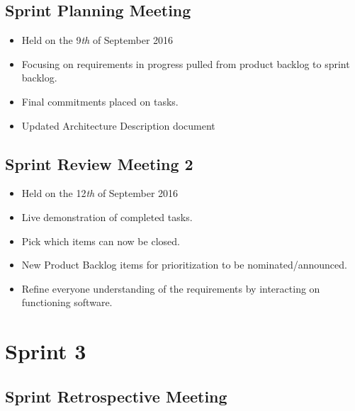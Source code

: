 \documentclass[a4paper]{article}
\begin{document}
\subsection{Sprint Planning Meeting}

\begin{itemize}
\item Held on the 9\textit{th} of September 2016
\item Focusing on requirements in progress pulled from product backlog to sprint backlog.
\item Final commitments placed on tasks.
\item Updated Architecture Description document
\end{itemize}

\subsection{Sprint Review Meeting 2}

\begin{itemize}
\item Held on the 12\textit{th} of September 2016
\item Live demonstration of completed tasks.
\item Pick which items can now be closed.
\item New Product Backlog items for prioritization to be nominated/announced.
\item Refine everyone understanding of the requirements by interacting on functioning software.
\end{itemize}

\section{Sprint 3}

\subsection{Sprint Retrospective Meeting}
\end{document}
